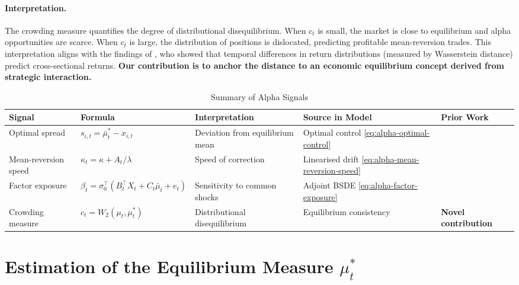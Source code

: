 \paragraph{Interpretation.} The crowding measure quantifies the degree of
distributional disequilibrium. When $c_t$ is small, the market is close to
equilibrium and alpha opportunities are scarce. When $c_t$ is large, the
distribution of positions is dislocated, predicting profitable mean-reversion
trades. This interpretation aligns with the findings of \citep{kimkorajczykneuhierl2015}, who showed that temporal differences in return distributions (measured by
Wasserstein distance) predict cross-sectional returns. \textbf{Our contribution is
to anchor the distance to an economic equilibrium concept derived from strategic
interaction.}

\begin{table}[ht]
\centering
\small
\caption{Summary of Alpha Signals}
\label{tab:alpha-signals-summary}
\begin{tabular}{p{1.7cm}p{2.6cm}p{2.7cm}p{2cm}p{2.4cm}}
\toprule
\textbf{Signal} & \textbf{Formula} & \textbf{Interpretation} & \textbf{Source in
    Model} & \textbf{Prior Work} \\
\midrule
Optimal spread & $s_{i,t} = \bar\mu_t^* - x_{i,t}$ & Deviation from equilibrium mean
    & Optimal control \eqref{eq:alpha-optimal-control} & \citep{cardaliaguetlehalle2018} \\
\addlinespace
Mean-reversion speed & $\kappa_t = \kappa + A_t/\lambda$ & Speed of correction &
    Linearised drift \eqref{eq:alpha-mean-reversion-speed} & \citep{lehallemouzouni2019} \\
\addlinespace
Factor exposure & $\beta_t = \sigma_0^\top(B_t^\top X_t + C_t \bar\mu_t + e_t)$ &
    Sensitivity to common shocks & Adjoint BSDE \eqref{eq:alpha-factor-exposure} &
    \citep{lehallemouzouni2019} \\
\addlinespace
Crowding measure & $c_t = W_2(\mu_t, \mu_t^*)$ & Distributional disequilibrium &
    Equilibrium consistency & \textbf{Novel contribution} \\
\bottomrule
\end{tabular}
\end{table}


\section{Estimation of the Equilibrium Measure $\mu_t^*$}
\label{sec:alpha-estimation}

